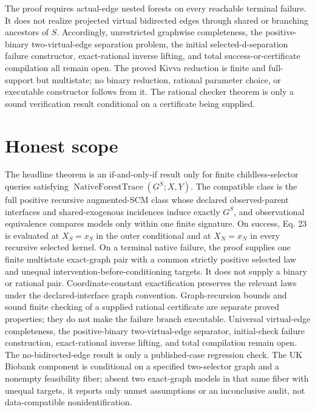 \documentclass{article}
\begin{document}
The proof requires actual-edge nested forests on every reachable terminal failure. It does not realize projected virtual bidirected edges through shared or branching ancestors of \(S\). Accordingly, unrestricted graphwise completeness, the positive-binary two-virtual-edge separation problem, the initial selected-d-separation failure constructor, exact-rational inverse lifting, and total success-or-certificate compilation all remain open. The proved Kivva reduction is finite and full-support but multistate; no binary reduction, rational parameter choice, or executable constructor follows from it. The rational checker theorem is only a sound verification result conditional on a certificate being supplied.

\section{Honest scope}

The headline theorem is an if-and-only-if result only for finite childless-selector queries satisfying \(\operatorname{NativeForestTrace}(G^S;X,Y)\). The compatible class is the full positive recursive augmented-SCM class whose declared observed-parent interfaces and shared-exogenous incidences induce exactly \(G^S\), and observational equivalence compares models only within one finite signature. On success, Eq. 23 is evaluated at \(X_S=x_S\) in the outer conditional and at \(X_N=x_N\) in every recursive selected kernel. On a terminal native failure, the proof supplies one finite multistate exact-graph pair with a common strictly positive selected law and unequal intervention-before-conditioning targets. It does not supply a binary or rational pair. Coordinate-constant exactification preserves the relevant laws under the declared-interface graph convention. Graph-recursion bounds and sound finite checking of a supplied rational certificate are separate proved properties; they do not make the failure branch executable. Universal virtual-edge completeness, the positive-binary two-virtual-edge separator, initial-check failure construction, exact-rational inverse lifting, and total compilation remain open. The no-bidirected-edge result is only a published-case regression check. The UK Biobank component is conditional on a specified two-selector graph and a nonempty feasibility fiber; absent two exact-graph models in that same fiber with unequal targets, it reports only unmet assumptions or an inconclusive audit, not data-compatible nonidentification.
\end{document}
